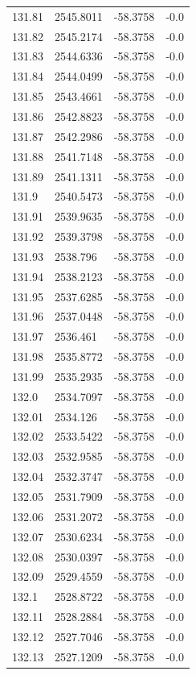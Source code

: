 \begin{table}[H]
\begin{tabular}{llll}
131.81 & 2545.8011 & -58.3758 & -0.0 \\
131.82 & 2545.2174 & -58.3758 & -0.0 \\
131.83 & 2544.6336 & -58.3758 & -0.0 \\
131.84 & 2544.0499 & -58.3758 & -0.0 \\
131.85 & 2543.4661 & -58.3758 & -0.0 \\
131.86 & 2542.8823 & -58.3758 & -0.0 \\
131.87 & 2542.2986 & -58.3758 & -0.0 \\
131.88 & 2541.7148 & -58.3758 & -0.0 \\
131.89 & 2541.1311 & -58.3758 & -0.0 \\
131.9 & 2540.5473 & -58.3758 & -0.0 \\
131.91 & 2539.9635 & -58.3758 & -0.0 \\
131.92 & 2539.3798 & -58.3758 & -0.0 \\
131.93 & 2538.796 & -58.3758 & -0.0 \\
131.94 & 2538.2123 & -58.3758 & -0.0 \\
131.95 & 2537.6285 & -58.3758 & -0.0 \\
131.96 & 2537.0448 & -58.3758 & -0.0 \\
131.97 & 2536.461 & -58.3758 & -0.0 \\
131.98 & 2535.8772 & -58.3758 & -0.0 \\
131.99 & 2535.2935 & -58.3758 & -0.0 \\
132.0 & 2534.7097 & -58.3758 & -0.0 \\
132.01 & 2534.126 & -58.3758 & -0.0 \\
132.02 & 2533.5422 & -58.3758 & -0.0 \\
132.03 & 2532.9585 & -58.3758 & -0.0 \\
132.04 & 2532.3747 & -58.3758 & -0.0 \\
132.05 & 2531.7909 & -58.3758 & -0.0 \\
132.06 & 2531.2072 & -58.3758 & -0.0 \\
132.07 & 2530.6234 & -58.3758 & -0.0 \\
132.08 & 2530.0397 & -58.3758 & -0.0 \\
132.09 & 2529.4559 & -58.3758 & -0.0 \\
132.1 & 2528.8722 & -58.3758 & -0.0 \\
132.11 & 2528.2884 & -58.3758 & -0.0 \\
132.12 & 2527.7046 & -58.3758 & -0.0 \\
132.13 & 2527.1209 & -58.3758 & -0.0 \\

\end{tabular}
\end{table}
